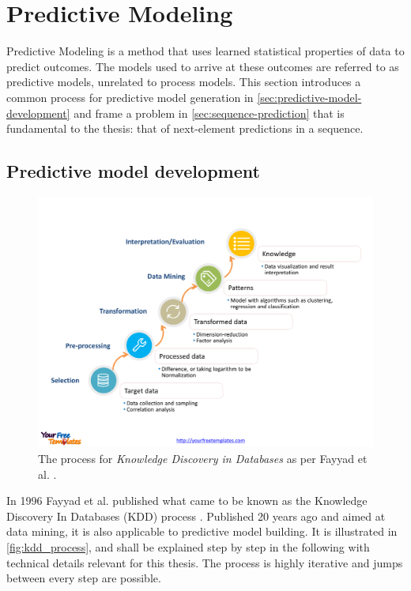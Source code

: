 \section{Predictive Modeling}\label{sec:predictive-modeling}
Predictive Modeling is a method that uses learned statistical properties of data to predict outcomes. The models used to arrive at these outcomes are referred to as predictive models, unrelated to process models. This section introduces a common process for predictive model generation in \autoref{sec:predictive-model-development} and frame a problem in \autoref{sec:sequence-prediction} that is fundamental to the thesis: that of next-element predictions in a sequence.

\subsection{Predictive model development}
\label{sec:predictive-model-development} 
\begin{figure}
	\centering
	\includegraphics[width=\textwidth]{gfx/kdd_process.png}
	\caption{The process for \textit{Knowledge Discovery in Databases} as per Fayyad et al. \cite{fayyad1996data}.}
	\label{fig:kdd_process}
\end{figure}

In 1996 Fayyad et al. published what came to be known as the Knowledge Discovery In Databases (KDD) process \cite{fayyad1996data}. Published 20 years ago and aimed at data mining, it is also applicable to predictive model building. It is illustrated in \autoref{fig:kdd_process}, and shall be explained step by step in the following with technical details relevant for this thesis. The process is highly iterative and jumps between every step are possible.

